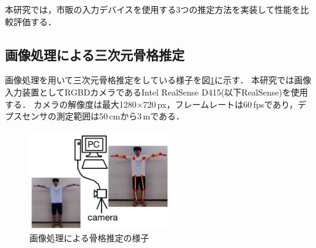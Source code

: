 \documentclass[titlepage]{jarticle}
\begin{document}
本研究では，市販の入力デバイスを使用する3つの推定方法を実装して性能を比較評価する．%
\subsection{画像処理による三次元骨格推定}\label{3Dskeleton}
画像処理を用いて三次元骨格推定をしている様子を図\ref{image_3D}\cite{open}に示す．
本研究では画像入力装置としてRGBDカメラであるIntel RealSense D415(以下RealSense)を使用する．
カメラの解像度は最大1280$\times$720\,px，フレームレートは60\,fpsであり，デプスセンサの測定範囲は50\,cmから3\,mである．
\begin{figure}[b]
  \centering
  \includegraphics[width=6cm]{img/image_3D.jpg}
  \caption{画像処理による骨格推定の様子}
  \label{image_3D}
\end{figure}
\end{document}
